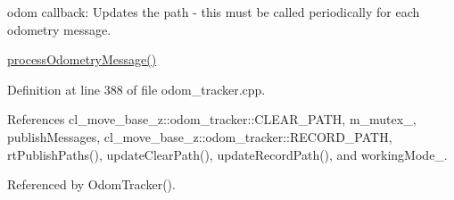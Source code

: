 odom callback\+: Updates the path -\/ this must be called periodically for each odometry message. 

\hyperlink{classcl__move__base__z_1_1odom__tracker_1_1OdomTracker_a12c5a839cfde2e8f2f55a5e0c9647b18}{process\+Odometry\+Message()} 

Definition at line 388 of file odom\+\_\+tracker.\+cpp.



References cl\+\_\+move\+\_\+base\+\_\+z\+::odom\+\_\+tracker\+::\+C\+L\+E\+A\+R\+\_\+\+P\+A\+TH, m\+\_\+mutex\+\_\+, publish\+Messages, cl\+\_\+move\+\_\+base\+\_\+z\+::odom\+\_\+tracker\+::\+R\+E\+C\+O\+R\+D\+\_\+\+P\+A\+TH, rt\+Publish\+Paths(), update\+Clear\+Path(), update\+Record\+Path(), and working\+Mode\+\_\+.



Referenced by Odom\+Tracker().



